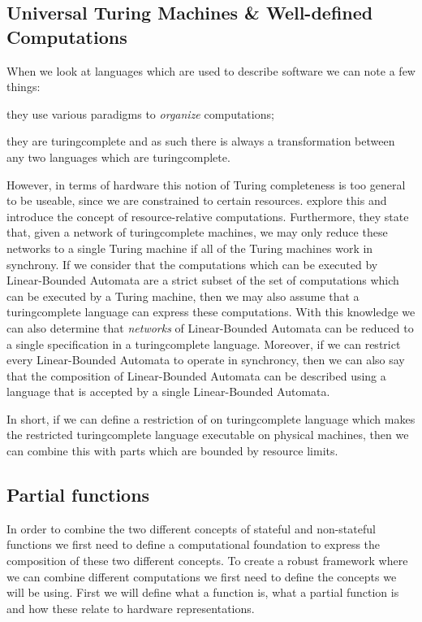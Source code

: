 \subsection{Universal Turing Machines \& Well-defined Computations}
When we look at languages which are used to describe software we can note a few things: 
\begin{inparaenum}
 \item they use various paradigms to \textit{organize} computations;
 \item they are \gls{turingcomplete} and as such there is always a transformation between any two languages which are \gls{turingcomplete}.
\end{inparaenum}
However, in terms of hardware this notion of Turing completeness is too general to be useable, since we are constrained to certain resources.  
\citeauthor{copeland1999beyond} explore this and introduce the concept of resource-relative computations. 
Furthermore, they state that, given a network of \gls{turingcomplete} machines, we may only reduce these networks to a single Turing machine if all of the Turing machines work in synchrony.
If we consider that the computations which can be executed by Linear-Bounded Automata  are a strict subset of the set of computations which can be executed by a Turing machine, then we may also assume that a \gls{turingcomplete} language can express these computations.
With this knowledge we can also determine that \textit{networks} of Linear-Bounded Automata can be reduced to a single specification in a \gls{turingcomplete} language.
Moreover, if we can restrict every Linear-Bounded Automata to operate in synchroncy, then we can also say that the composition of Linear-Bounded Automata can be described using a language that is accepted by a single Linear-Bounded Automata.

In short, if we can define a restriction of on \gls{turingcomplete} language which makes the restricted \gls{turingcomplete} language executable on physical machines, then we can combine this with parts which are bounded by resource limits.

\subsection{Partial functions}
In order to combine the two different concepts of stateful and non-stateful functions we first need to define a computational foundation to express the composition of these two different concepts.
To create a robust framework where we can combine different computations we first need to define the concepts we will be using.
First we will define what a function is, what a partial function is and how these relate to hardware representations.

